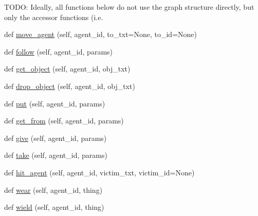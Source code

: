 \begin{DoxyCompactItemize}
\begin{DoxyCompactList}
 T\+O\+DO\+: Ideally, all functions below do not use the graph structure directly, but only the accessor functions (i.\+e. \end{DoxyCompactList}\item 
def \hyperlink{classprojects_1_1mastering__the__dungeon_1_1tasks_1_1graph__world2_1_1graph_1_1Graph_a22747eb7801d7fabd0af3400410ae83d}{move\+\_\+agent} (self, agent\+\_\+id, to\+\_\+txt=None, to\+\_\+id=None)
\item 
def \hyperlink{classprojects_1_1mastering__the__dungeon_1_1tasks_1_1graph__world2_1_1graph_1_1Graph_a69ce0daca3f7c28c02e0c858d4b7e2e9}{follow} (self, agent\+\_\+id, params)
\item 
def \hyperlink{classprojects_1_1mastering__the__dungeon_1_1tasks_1_1graph__world2_1_1graph_1_1Graph_a4efc9cab1e760d98614810c72dc075ee}{get\+\_\+object} (self, agent\+\_\+id, obj\+\_\+txt)
\item 
def \hyperlink{classprojects_1_1mastering__the__dungeon_1_1tasks_1_1graph__world2_1_1graph_1_1Graph_ac41cef28bdac9c94bb8622e9f19506e5}{drop\+\_\+object} (self, agent\+\_\+id, obj\+\_\+txt)
\item 
def \hyperlink{classprojects_1_1mastering__the__dungeon_1_1tasks_1_1graph__world2_1_1graph_1_1Graph_a574ecd8c8313952047c19dc910129460}{put} (self, agent\+\_\+id, params)
\item 
def \hyperlink{classprojects_1_1mastering__the__dungeon_1_1tasks_1_1graph__world2_1_1graph_1_1Graph_ae184354b5a945cec6e70b9d961b7856c}{get\+\_\+from} (self, agent\+\_\+id, params)
\item 
def \hyperlink{classprojects_1_1mastering__the__dungeon_1_1tasks_1_1graph__world2_1_1graph_1_1Graph_a38fea5cf99bdf0d057082af566763dca}{give} (self, agent\+\_\+id, params)
\item 
def \hyperlink{classprojects_1_1mastering__the__dungeon_1_1tasks_1_1graph__world2_1_1graph_1_1Graph_a17a562ca25e8ef876deaa6aae8a7c5e6}{take} (self, agent\+\_\+id, params)
\item 
def \hyperlink{classprojects_1_1mastering__the__dungeon_1_1tasks_1_1graph__world2_1_1graph_1_1Graph_a8709bca6f375c14cbfaa578228f94fcb}{hit\+\_\+agent} (self, agent\+\_\+id, victim\+\_\+txt, victim\+\_\+id=None)
\item 
def \hyperlink{classprojects_1_1mastering__the__dungeon_1_1tasks_1_1graph__world2_1_1graph_1_1Graph_a3e325f222b98c939673190da0f1f4b79}{wear} (self, agent\+\_\+id, thing)
\item 
def \hyperlink{classprojects_1_1mastering__the__dungeon_1_1tasks_1_1graph__world2_1_1graph_1_1Graph_aa045bba6d2db124d119b7338c5ad79f4}{wield} (self, agent\+\_\+id, thing)

\end{DoxyCompactItemize}
